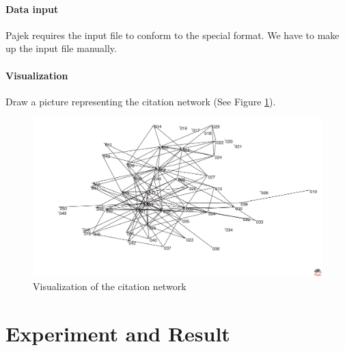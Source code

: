 \paragraph{Data input}
Pajek requires the input file to conform to the special format. We have to make up the input file manually.   
\paragraph{Visualization}
Draw a picture representing the citation network (See Figure \ref{F:graph}).
\begin{figure}[ht!]
\includegraphics [totalheight=0.5\textheight]{images/citation1}
\caption {Visualization of the citation network}
\label {F:graph}
\end{figure}


\section{Experiment and Result \label{S:Result}}
